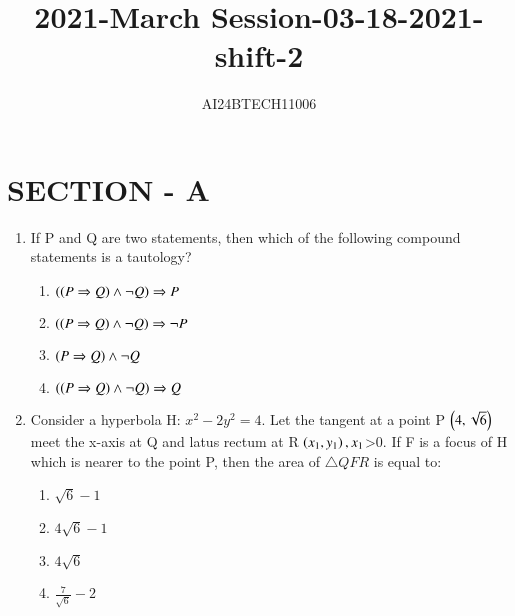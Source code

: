 \documentclass[journal,12pt,twocolumn]{IEEEtran}
\theoremstyle{remark}
\begin{document}

\vspace{3cm}
\title{2021-March Session-03-18-2021-shift-2}
\author{AI24BTECH11006}
\maketitle
\section{SECTION - A}
\begin{enumerate}[start=16]
\item If P and Q are two statements, then which of the following compound statements is a tautology?
\hfill{}

	\begin{enumerate}
    
\item  $\left(\left(P \Rightarrow Q\right) \land \neg Q\right) \Rightarrow P$ 
\item   $\left(\left(P \Rightarrow Q\right) \land \neg Q\right) \Rightarrow \neg P $
\item $ \left(P \Rightarrow Q\right) \land \neg Q$ 
\item  $\left(\left(P \Rightarrow Q\right) \land \neg Q\right) \Rightarrow Q $


\end{enumerate}
\item  Consider a hyperbola H: $x^2 -2y^2=4$. Let the tangent at a point P $\left(4,\sqrt{6}\right)$ meet the x-axis at Q and latus rectum at R $\left(x_1,y_1\right) , x_1 $\textgreater 0. If F is a focus of H which is nearer to the point P, then the area of $\triangle{QFR}$ is equal to:
\hfill{}
	\begin{enumerate}
\item $\sqrt{6} - 1$
\item  $4\sqrt{6} - 1$
\item  $4\sqrt{6} $
\item $\frac{7}{\sqrt{6}} - 2 $



\end{enumerate}
\end{enumerate}
\end{document}
